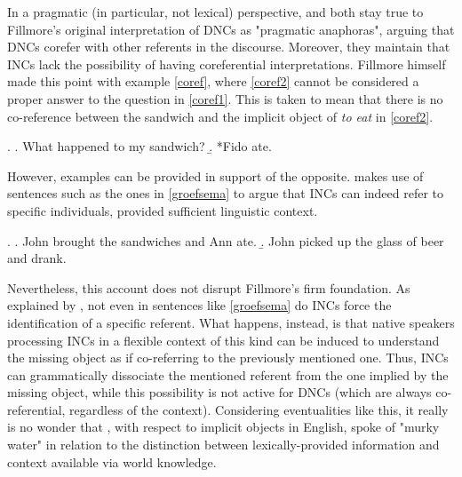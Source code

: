 In a pragmatic (in particular, not lexical) perspective, \textcite[44]{AnderBois} and \textcite[53-54]{Melchin2019} both stay true to Fillmore's original interpretation of DNCs as "pragmatic anaphoras", arguing that DNCs corefer with other referents in the discourse. Moreover, they maintain that INCs lack the possibility of having coreferential interpretations. Fillmore himself \parencite[97]{Fillmore1986} made this point with example \ref{coref}, where \ref{coref2} cannot be considered a proper answer to the question in \ref{coref1}. This is taken to mean that there is no co-reference between the sandwich and the implicit object of \textit{to eat} in \ref{coref2}.

\ex. \label{coref} \a. \label{coref1} What happened to my sandwich?
\b. \label{coref2} *Fido ate.

However, examples can be provided in support of the opposite. \textcite[142-144]{groefsema1995understood} makes use of sentences such as the ones in \ref{groefsema} to argue that INCs can indeed refer to specific individuals, provided sufficient linguistic context.

\ex. \label{groefsema} \a. \label{groefsema1} John brought the sandwiches and Ann ate.
\b. \label{groefsema2} John picked up the glass of beer and drank.

Nevertheless, this account does not disrupt Fillmore's firm foundation. As explained by \textcite[527]{Eu2018}, not even in sentences like \ref{groefsema} do INCs force the identification of a specific referent. What happens, instead, is that native speakers processing INCs in a flexible context of this kind can be induced to understand the missing object as if co-referring to the previously mentioned one. Thus, INCs can grammatically dissociate the mentioned referent from the one implied by the missing object, while this possibility is not active for DNCs (which are always co-referential, regardless of the context). Considering eventualities like this, it really is no wonder that \textcite[110]{Cote1996}, with respect to implicit objects in English, spoke of "murky water" in relation to the distinction between lexically-provided information and context available via world knowledge.




